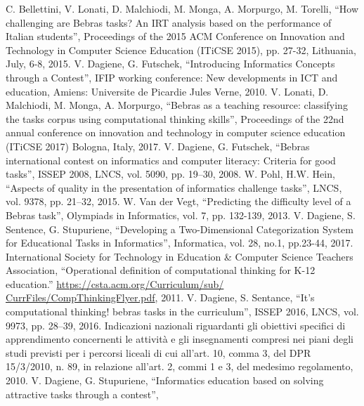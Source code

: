 \documentclass[12pt]{report}
\begin{document}
%
\begin{thebibliography}{00}
%
C. Bellettini, V. Lonati, D. Malchiodi, M. Monga, A. Morpurgo, M. Torelli, 
``How challenging are Bebras tasks? An IRT analysis based on the performance of Italian students'', 
Proceedings of the 2015 ACM Conference on Innovation and Technology in Computer Science Education (ITiCSE 2015), 
pp. 27-32, 
Lithuania, 
July, 6-8, 
2015.
%
V. Dagiene, G. Futschek, 
``Introducing Informatics Concepts through a Contest'', 
IFIP working conference: New developments in ICT and education, 
Amiens: Universite de Picardie Jules Verne, 
2010.
%
V. Lonati, D. Malchiodi, M. Monga, A. Morpurgo, 
``Bebras as a teaching resource: classifying the tasks corpus using computational thinking skills'', 
Proceedings of the 22nd annual conference on innovation and technology in computer science education (ITiCSE 2017) 
Bologna, Italy, 
2017.
%
V. Dagiene, G. Futschek, 
``Bebras international contest on informatics and computer literacy: Criteria for good tasks'', 
ISSEP 2008, 
LNCS, vol. 5090, 
pp. 19–30, 
2008.
%
W. Pohl, H.W. Hein,
``Aspects of quality in the presentation of informatics challenge tasks'', 
LNCS, vol. 9378, 
pp. 21–32,
2015.
%
W. Van der Vegt, 
``Predicting the difficulty level of a Bebras task'',
Olympiads in Informatics,
vol. 7, 
pp. 132-139,
2013.
%
V. Dagiene, S. Sentence, G. Stupuriene, 
``Developing a Two-Dimensional Categorization System for Educational Tasks in Informatics'', 
Informatica, vol. 28, no.1, 
pp.23-44, 
2017.
%
International Society for Technology in Education \& Computer Science Teachers Association, 
``Operational definition of computational thinking for K-12 education.''
\url{https://csta.acm.org/Curriculum/sub/ CurrFiles/CompThinkingFlyer.pdf}, 
2011.
%
V. Dagiene, S. Sentance, 
``It’s computational thinking! bebras tasks in the curriculum'', 
ISSEP 2016, 
LNCS, vol. 9973, 
pp. 28–39, 
2016.
%
Indicazioni nazionali riguardanti gli obiettivi specifici di apprendimento concernenti le attività e gli insegnamenti compresi nei piani degli studi previsti per i percorsi liceali di cui all'art. 10, comma 3, del DPR 15/3/2010, n. 89, in relazione all'art. 2, commi 1 e 3, del medesimo regolamento, 2010.
%
V. Dagiene, G. Stupuriene, 
``Informatics education based on solving attractive tasks through a contest'', 

\end{thebibliography}
\end{document}
